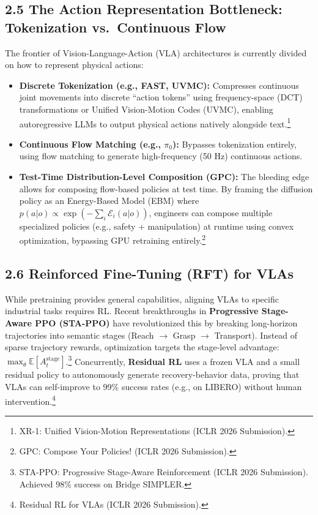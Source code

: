 \documentclass[11pt,a4paper]{article}
\begin{document}
\subsection{2.5 The Action Representation Bottleneck: Tokenization vs.\ Continuous Flow}
The frontier of Vision-Language-Action (VLA) architectures is currently divided on how to represent physical actions:
\begin{itemize}
    \item \textbf{Discrete Tokenization (e.g., FAST, UVMC):} Compresses continuous joint movements into discrete ``action tokens'' using frequency-space (DCT) transformations or Unified Vision-Motion Codes (UVMC), enabling autoregressive LLMs to output physical actions natively alongside text.\footnote{XR-1: Unified Vision-Motion Representations (ICLR 2026 Submission).}
    \item \textbf{Continuous Flow Matching (e.g., $\pi_0$):} Bypasses tokenization entirely, using flow matching to generate high-frequency (50 Hz) continuous actions. 
    \item \textbf{Test-Time Distribution-Level Composition (GPC):} The bleeding edge allows for composing flow-based policies at test time. By framing the diffusion policy as an Energy-Based Model (EBM) where $p(a|o) \propto \exp(-\sum_i \mathcal{E}_i(a|o))$, engineers can compose multiple specialized policies (e.g., safety + manipulation) at runtime using convex optimization, bypassing GPU retraining entirely.\footnote{GPC: Compose Your Policies! (ICLR 2026 Submission).}
\end{itemize}

\subsection{2.6 Reinforced Fine-Tuning (RFT) for VLAs}
While pretraining provides general capabilities, aligning VLAs to specific industrial tasks requires RL. Recent breakthroughs in \textbf{Progressive Stage-Aware PPO (STA-PPO)} have revolutionized this by breaking long-horizon trajectories into semantic stages (Reach $\rightarrow$ Grasp $\rightarrow$ Transport). Instead of sparse trajectory rewards, optimization targets the stage-level advantage: $\max_\theta \mathbb{E}[A^{\text{stage}}_t]$.\footnote{STA-PPO: Progressive Stage-Aware Reinforcement (ICLR 2026 Submission). Achieved 98\% success on Bridge SIMPLER.} Concurrently, \textbf{Residual RL} uses a frozen VLA and a small residual policy to autonomously generate recovery-behavior data, proving that VLAs can self-improve to 99\% success rates (e.g., on LIBERO) without human intervention.\footnote{Residual RL for VLAs (ICLR 2026 Submission).}
\end{document}

